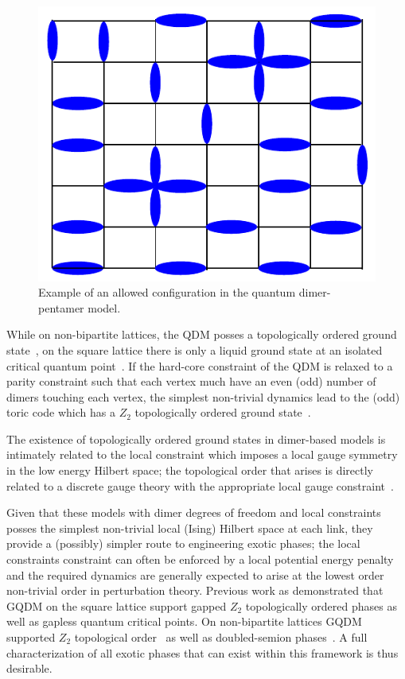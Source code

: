 \documentclass[twocolumn,prb,aps,floatfix,superscriptaddress]{revtex4-1}
\begin{document}
\begin{figure}[b!]
    \centering
    \includegraphics[width=0.5\columnwidth]{QDPM_ex_config.pdf}
    \caption{Example of an allowed configuration in the quantum dimer-pentamer model.}
    \label{fig:QDPMex}
\end{figure}

While on non-bipartite lattices, the QDM posses a topologically ordered ground state~\cite{Moessner2001a,Fendley2002}, on the square lattice there is only a liquid ground state at an isolated critical quantum point~\cite{Leung1996,Syljuasen2006}. If the hard-core constraint of the QDM is relaxed to a parity constraint such that each vertex much have an even (odd) number of dimers touching each vertex, the simplest non-trivial dynamics lead to the (odd) toric code which has a $Z_2$ topologically ordered ground state~\cite{Kitaev2003,Wen2003}. 

The existence of topologically ordered ground states in dimer-based models is intimately related to the local constraint which imposes a local gauge symmetry in the low energy Hilbert space; the topological order that arises is directly related to a discrete gauge theory with the appropriate local gauge constraint~\cite{Moessner2001}.

Given that these models with dimer degrees of freedom and local constraints posses the simplest non-trivial local (Ising) Hilbert space at each link, they provide a (possibly) simpler route to engineering exotic phases; the local constraints constraint can often be enforced by a local potential energy penalty and the required dynamics are generally expected to arise at the lowest order non-trivial order in perturbation theory. Previous work as demonstrated that GQDM on the square lattice support gapped $Z_2$ topologically ordered phases as well as gapless quantum critical points. On non-bipartite lattices GQDM supported $Z_2$ topological order~\cite{Moessner2001a,Misguich2002} as well as doubled-semion phases~\cite{Qi2014,Buerschaper2014a}. A full characterization of all exotic phases that can exist within this framework is thus desirable.
\end{document}
